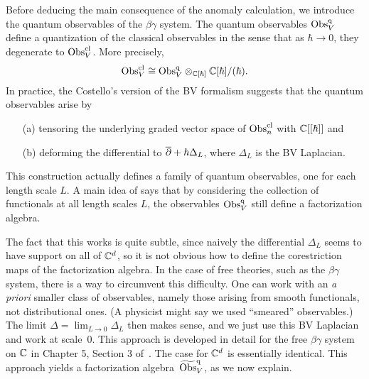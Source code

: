 Before deducing the main consequence of the anomaly calculation, we introduce the quantum observables of the $\beta\gamma$ system. 
The quantum observables ${\rm Obs}^{{\rm q}}_V$ define a quantization of the classical observables in the sense that
as $\hbar \to 0$, they degenerate to ${\rm Obs}^{\rm cl}_V$.
More precisely, 
\[
{\rm Obs}^{{\rm cl}}_V \cong {\rm Obs}^{\rm q}_V \otimes_{\mathbb C[\hbar]} \mathbb C[\hbar]/(\hbar).
\]
In practice, the Costello's version of the BV formalism suggests that the quantum observables arise by 
\begin{enumerate}
\item[(a)] tensoring the underlying graded vector space of ${\rm Obs}^{\rm cl}_n$ with $\mathbb C[[\hbar]]$ and
\item[(b)] deforming the differential to $\overline{\partial} +\hbar \Delta_L$, where $\Delta_L$ is the BV Laplacian.
\end{enumerate}
This construction actually defines a family of quantum observables, one for each length scale $L$. 
A main idea of \cite{CG2} says that by considering the collection of functionals at all length scales $L$, the observables ${\rm Obs}^{\rm q}_V$ still define a factorization algebra. 

The fact that this works is quite subtle, since naively the differential $\Delta_L$ seems to have support on all of $\mathbb C^d$, so it is not obvious how to define the corestriction maps of the factorization algebra. 
In the case of free theories, such as the $\beta\gamma$ system, there is a way to circumvent this difficulty. 
One can work with an {\it a priori} smaller class of observables, namely those arising from smooth functionals, not distributional ones.
(A physicist might say we used ``smeared'' observables.)
The limit $\Delta = \lim_{L \to 0} \Delta_L$ then makes sense, and we just use this BV Laplacian and work at scale~0. 
This approach is developed in detail for the free $\beta\gamma$ system on $\mathbb C$ in Chapter 5, Section 3 of~\cite{CG1}. 
The case for $\mathbb C^d$ is essentially identical. 
This approach yields a factorization algebra~$\widetilde{{\rm Obs}}^{\rm q}_V$, as we now explain.

